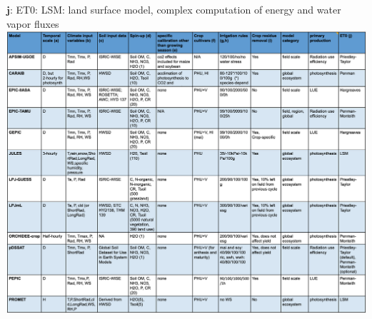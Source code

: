 \documentclass[10pt]{article}
\begin{document}
\begin{table}[h!]
{        $\textbf{j:}$ ET0: LSM: land surface model, complex computation of energy and water vapor fluxes\\
    }
    \vspace{-5mm}
    \includegraphics[width=\textwidth]{model_table.png}
    \label{fig:models}
\end{table}
\end{document}
